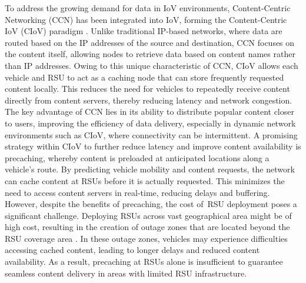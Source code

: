 \documentclass{aims}
\numberwithin{equation}{section}
\begin{document}
To address the growing demand for data in IoV environments, Content-Centric Networking (CCN) has been integrated into IoV, forming the Content-Centric IoV (CIoV) paradigm \cite{Li2017, Khan2024}.
Unlike traditional IP-based networks, where data are routed based on the IP addresses of the source and destination, CCN focuses on the content itself, allowing nodes to retrieve data based on content names rather than IP addresses. Owing to this unique characteristic of CCN, CIoV allows each vehicle and RSU to act as a caching node that can store frequently requested content locally. This reduces the need for vehicles to repeatedly receive content directly from content servers, thereby reducing latency and network congestion. The key advantage of CCN lies in its ability to distribute popular content closer to users, improving the efficiency of data delivery, especially in dynamic network environments such as CIoV, where connectivity can be intermittent.
A promising strategy within CIoV to further reduce latency and improve content availability is precaching, whereby content is preloaded at anticipated locations along a vehicle's route.
By predicting vehicle mobility and content requests, the network can cache content at RSUs before it is actually requested. This minimizes the need to access content servers in real-time, reducing delays and buffering. However, despite the benefits of precaching, the cost of~RSU deployment poses a significant challenge. Deploying RSUs across vast geographical area might be of high cost, resulting in the creation of outage zones that are located beyond the RSU coverage area \cite{Ahmed2018, Wang2021}. In these outage zones, vehicles may experience difficulties accessing cached content, leading to longer delays and reduced content availability. As a result, precaching at RSUs alone is insufficient to guarantee seamless content delivery in areas with limited RSU infrastructure.
\end{document}
